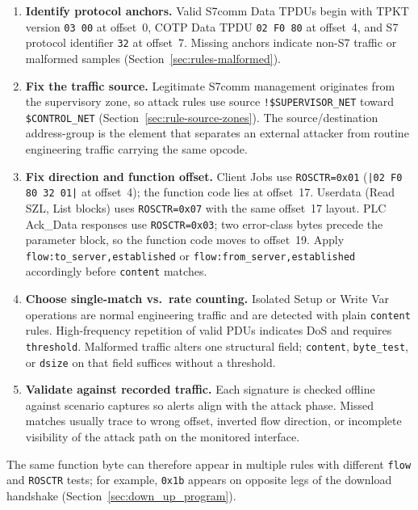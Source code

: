 \documentclass[../main.tex]{subfiles}
\begin{document}
\begin{enumerate}
    \item \textbf{Identify protocol anchors.} Valid S7comm Data TPDUs begin with TPKT version \texttt{03 00} at offset~0, COTP Data TPDU \texttt{02 F0 80} at offset~4, and S7 protocol identifier \texttt{32} at offset~7. Missing anchors indicate non-S7 traffic or malformed samples (Section~\ref{sec:rules-malformed}).

    \item \textbf{Fix the traffic source.} Legitimate S7comm management originates from the supervisory zone, so attack rules use source \texttt{!\$SUPERVISOR\_NET} toward \texttt{\$CONTROL\_NET} (Section~\ref{sec:rule-source-zones}). The source/destination address-group is the element that separates an external attacker from routine engineering traffic carrying the same opcode.

    \item \textbf{Fix direction and function offset.} Client Jobs use \texttt{ROSCTR=0x01} (\texttt{|02 F0 80 32 01|} at offset~4); the function code lies at offset~17. Userdata (Read SZL, List blocks) uses \texttt{ROSCTR=0x07} with the same offset~17 layout. PLC Ack\_Data responses use \texttt{ROSCTR=0x03}; two error-class bytes precede the parameter block, so the function code moves to offset~19. Apply \texttt{flow:to\_server,established} or \texttt{flow:from\_server,established} accordingly before \texttt{content} matches.

    \item \textbf{Choose single-match vs.\ rate counting.} Isolated Setup or Write Var operations are normal engineering traffic and are detected with plain \texttt{content} rules. High-frequency repetition of valid PDUs indicates DoS and requires \texttt{threshold}. Malformed traffic alters one structural field; \texttt{content}, \texttt{byte\_test}, or \texttt{dsize} on that field suffices without a threshold.

    \item \textbf{Validate against recorded traffic.} Each signature is checked offline against scenario captures so alerts align with the attack phase. Missed matches usually trace to wrong offset, inverted flow direction, or incomplete visibility of the attack path on the monitored interface.
\end{enumerate}

The same function byte can therefore appear in multiple rules with different \texttt{flow} and \texttt{ROSCTR} tests; for example, \texttt{0x1b} appears on opposite legs of the download handshake (Section~\ref{sec:down_up_program}).
\end{document}
